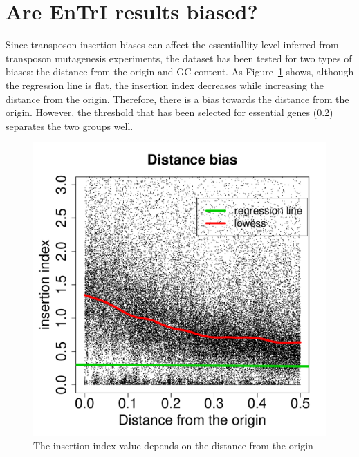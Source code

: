 \documentclass[a4paper,10pt, twocolumn]{article}
\begin{document}
\section{Are EnTrI results biased?}
Since transposon insertion biases can affect the essentiallity level inferred from transposon mutagenesis experiments, the dataset has been tested for two types of biases: the distance from the origin and GC content. As Figure~\ref{fig:distance_bias} shows, although the regression line is flat, the insertion index decreases while increasing the distance from the origin. Therefore, there is a bias towards the distance from the origin. However, the threshold that has been selected for essential genes (0.2) separates the two groups well.
\begin{figure}[H]
\includegraphics[scale=0.28, page=1]{biases.pdf}
\caption{The insertion index value depends on the distance from the origin}
\label{fig:distance_bias}
\end{figure}
\end{document}
